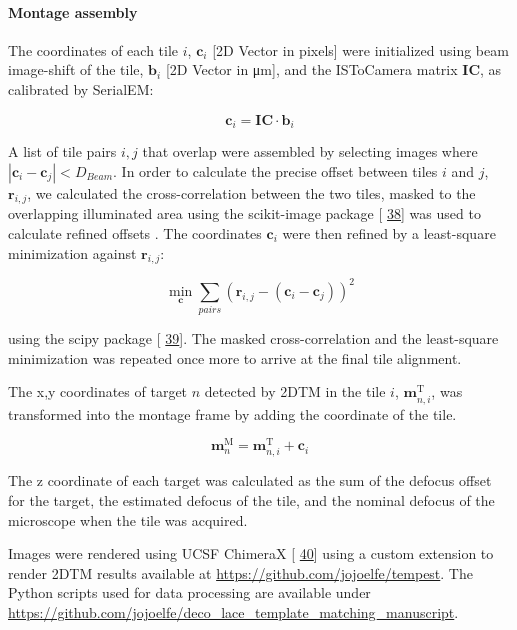 \documentclass[
]{article}
\providecommand{\DIFaddbegin}{} %
\providecommand{\DIFaddend}{} %
\providecommand{\DIFdelbegin}{} %
\providecommand{\DIFdelend}{} %
\newcommand{\DIFscaledelfig}{0.5}
\newlength{\DIFdelgraphicswidth} %
\newlength{\DIFdelgraphicsheight} %
\newcommand{\DIFaddincludegraphics}[2][]{{\color{blue}\fbox{\DIFOincludegraphics[#1]{#2}}}} %
\newcommand{\DIFdelincludegraphics}[2][]{%
\sbox{\DIFdelgraphicsbox}{\DIFOincludegraphics[#1]{#2}}%
\settoboxwidth{\DIFdelgraphicswidth}{\DIFdelgraphicsbox} %
\settoboxtotalheight{\DIFdelgraphicsheight}{\DIFdelgraphicsbox} %
\scalebox{\DIFscaledelfig}{%
\parbox[b]{\DIFdelgraphicswidth}{\usebox{\DIFdelgraphicsbox}\\[-\baselineskip] \rule{\DIFdelgraphicswidth}{0em}}\llap{\resizebox{\DIFdelgraphicswidth}{\DIFdelgraphicsheight}{%
\setlength{\unitlength}{\DIFdelgraphicswidth}%
\begin{picture}(1,1)%
\thicklines\linethickness{2pt} %
{\color[rgb]{1,0,0}\put(0,0){\framebox(1,1){}}}%
{\color[rgb]{1,0,0}\put(0,0){\line( 1,1){1}}}%
{\color[rgb]{1,0,0}\put(0,1){\line(1,-1){1}}}%
\end{picture}%
}\hspace*{3pt}}} %
} %
\DeclareRobustCommand{\DIFaddbegin}{\DIFOaddbegin \let\includegraphics\DIFaddincludegraphics} %
\DeclareRobustCommand{\DIFaddend}{\DIFOaddend \let\includegraphics\DIFOincludegraphics} %
\DeclareRobustCommand{\DIFdelbegin}{\DIFOdelbegin \let\includegraphics\DIFdelincludegraphics} %
\DeclareRobustCommand{\DIFdelend}{\DIFOaddend \let\includegraphics\DIFOincludegraphics} %
\begin{document}
\hypertarget{montage-assembly}{%
\paragraph{Montage assembly}\label{montage-assembly}}

The coordinates of each tile \(i\), \(\mathbf{c}_{i}\) {[}2D Vector in
pixels{]} were initialized using beam image-shift of the tile,
\(\mathbf{b}_i\) {[}2D Vector in μm{]}, and the ISToCamera matrix
\(\mathbf{IC}\), as calibrated by SerialEM:

\[\mathbf{c}_{i} = \mathbf{IC} \cdot \mathbf{b}_i\]

A list of tile pairs \(i,j\) that overlap were assembled by selecting
images where \(|\mathbf{c}_i-\mathbf{c}_j| < D_{Beam}\). In order to
calculate the precise offset between tiles \(i\) and \(j\),
\(\mathbf{r}_{i,j}\), we calculated the cross-correlation between the two
tiles, masked to the overlapping illuminated area using the scikit-image
package {[}\protect\DIFdelbegin %
\DIFdelend \DIFaddbegin \hyperlink{ref-stvWEJeu}{38}{]} \DIFaddend was used to calculate refined offsets .
The coordinates \(\mathbf{c}_{i}\) were then refined by a least-square
minimization against \(\mathbf{r}_{i,j}\):

\[ \displaystyle{\min_{\mathbf{c}} \sum_{pairs}{(\mathbf{r}_{i,j} - (\mathbf{c}_i-\mathbf{c}_j))^2}}\]

using the scipy package {[}\protect\DIFdelbegin %
\DIFdelend \DIFaddbegin \hyperlink{ref-8Miti2Gz}{39}{]}\DIFaddend . The masked
cross-correlation and the least-square minimization was repeated once
more to arrive at the final tile alignment.

The x,y coordinates of target \(n\) detected by 2DTM in the tile \(i\),
\(\textbf{m}^\textrm{T}_{n,i}\), was transformed into the montage frame by
adding the coordinate of the tile.

\[ \textbf{m}^\textrm{M}_n = \textbf{m}^\textrm{T}_{n,i} + \textbf{c}_i\]

The z coordinate of each target was calculated as the sum of the defocus
offset for the target, the estimated defocus of the tile, and the
nominal defocus of the microscope when the tile was acquired.

Images were rendered using UCSF ChimeraX {[}\protect\DIFdelbegin %
\DIFdelend \DIFaddbegin \hyperlink{ref-cYCuuZxG}{40}{]} \DIFaddend using a
custom extension to render 2DTM results available at
\url{https://github.com/jojoelfe/tempest}. The Python scripts used for data
processing are available under
\url{https://github.com/jojoelfe/deco_lace_template_matching_manuscript}.
\end{document}

